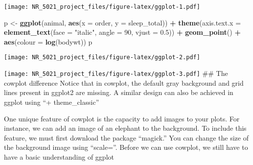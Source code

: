 \documentclass[]{article}
\newenvironment{Shaded}{\begin{snugshade}}{\end{snugshade}}
\newcommand{\KeywordTok}[1]{\textcolor[rgb]{0.13,0.29,0.53}{\textbf{#1}}}
\newcommand{\DataTypeTok}[1]{\textcolor[rgb]{0.13,0.29,0.53}{#1}}
\newcommand{\DecValTok}[1]{\textcolor[rgb]{0.00,0.00,0.81}{#1}}
\newcommand{\FloatTok}[1]{\textcolor[rgb]{0.00,0.00,0.81}{#1}}
\newcommand{\StringTok}[1]{\textcolor[rgb]{0.31,0.60,0.02}{#1}}
\newcommand{\OperatorTok}[1]{\textcolor[rgb]{0.81,0.36,0.00}{\textbf{#1}}}
\newcommand{\NormalTok}[1]{#1}
\begin{document}
\texttt{[image: NR\_5021\_project\_files/figure-latex/ggplot-1.pdf]}

\begin{Shaded}
\begin{Highlighting}[]
\NormalTok{p <-}\StringTok{ }\KeywordTok{ggplot}\NormalTok{(animal, }\KeywordTok{aes}\NormalTok{(}\DataTypeTok{x =}\NormalTok{ order, }\DataTypeTok{y =}\NormalTok{ sleep_total)) }\OperatorTok{+}\StringTok{ }\KeywordTok{theme}\NormalTok{(}\DataTypeTok{axis.text.x =} \KeywordTok{element_text}\NormalTok{(}\DataTypeTok{face =} \StringTok{"italic"}\NormalTok{, }\DataTypeTok{angle =} \DecValTok{90}\NormalTok{, }\DataTypeTok{vjust =} \FloatTok{0.5}\NormalTok{)) }\OperatorTok{+}\StringTok{ }\KeywordTok{geom_point}\NormalTok{() }\OperatorTok{+}\StringTok{ }\KeywordTok{aes}\NormalTok{(}\DataTypeTok{colour =} \KeywordTok{log}\NormalTok{(bodywt))}
\NormalTok{p }
\end{Highlighting}
\end{Shaded}

\texttt{[image: NR\_5021\_project\_files/figure-latex/ggplot-2.pdf]}

\begin{Shaded}
\end{Shaded}

\texttt{[image: NR\_5021\_project\_files/figure-latex/ggplot-3.pdf]} \#\#
The cowplot difference Notice that in cowplot, the default gray
background and grid lines present in ggplot2 are missing. A similar
design can also be achieved in ggplot using ``+ theme\_classic''

One unique feature of cowplot is the capacity to add images to your
plots. For instance, we can add an image of an elephant to the
background. To include this feature, we must first download the package
``magick.'' You can change the size of the background image using
``scale=''. Before we can use cowplot, we still have to have a basic
understanding of ggplot
\end{document}
